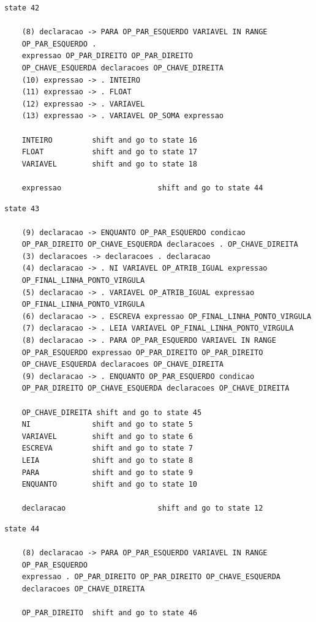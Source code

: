 \documentclass[a4paper,12pt]{article}
\begin{document}
\begin{verbatim}
state 42

    (8) declaracao -> PARA OP_PAR_ESQUERDO VARIAVEL IN RANGE 
    OP_PAR_ESQUERDO . 
    expressao OP_PAR_DIREITO OP_PAR_DIREITO 
    OP_CHAVE_ESQUERDA declaracoes OP_CHAVE_DIREITA
    (10) expressao -> . INTEIRO
    (11) expressao -> . FLOAT
    (12) expressao -> . VARIAVEL
    (13) expressao -> . VARIAVEL OP_SOMA expressao

    INTEIRO         shift and go to state 16
    FLOAT           shift and go to state 17
    VARIAVEL        shift and go to state 18

    expressao                      shift and go to state 44

\end{verbatim}

\begin{verbatim}
state 43

    (9) declaracao -> ENQUANTO OP_PAR_ESQUERDO condicao 
    OP_PAR_DIREITO OP_CHAVE_ESQUERDA declaracoes . OP_CHAVE_DIREITA
    (3) declaracoes -> declaracoes . declaracao
    (4) declaracao -> . NI VARIAVEL OP_ATRIB_IGUAL expressao 
    OP_FINAL_LINHA_PONTO_VIRGULA
    (5) declaracao -> . VARIAVEL OP_ATRIB_IGUAL expressao 
    OP_FINAL_LINHA_PONTO_VIRGULA
    (6) declaracao -> . ESCREVA expressao OP_FINAL_LINHA_PONTO_VIRGULA
    (7) declaracao -> . LEIA VARIAVEL OP_FINAL_LINHA_PONTO_VIRGULA
    (8) declaracao -> . PARA OP_PAR_ESQUERDO VARIAVEL IN RANGE 
    OP_PAR_ESQUERDO expressao OP_PAR_DIREITO OP_PAR_DIREITO 
    OP_CHAVE_ESQUERDA declaracoes OP_CHAVE_DIREITA
    (9) declaracao -> . ENQUANTO OP_PAR_ESQUERDO condicao 
    OP_PAR_DIREITO OP_CHAVE_ESQUERDA declaracoes OP_CHAVE_DIREITA

    OP_CHAVE_DIREITA shift and go to state 45
    NI              shift and go to state 5
    VARIAVEL        shift and go to state 6
    ESCREVA         shift and go to state 7
    LEIA            shift and go to state 8
    PARA            shift and go to state 9
    ENQUANTO        shift and go to state 10

    declaracao                     shift and go to state 12
\end{verbatim}

\begin{verbatim}
state 44

    (8) declaracao -> PARA OP_PAR_ESQUERDO VARIAVEL IN RANGE 
    OP_PAR_ESQUERDO 
    expressao . OP_PAR_DIREITO OP_PAR_DIREITO OP_CHAVE_ESQUERDA 
    declaracoes OP_CHAVE_DIREITA

    OP_PAR_DIREITO  shift and go to state 46
\end{verbatim}
\end{document}

